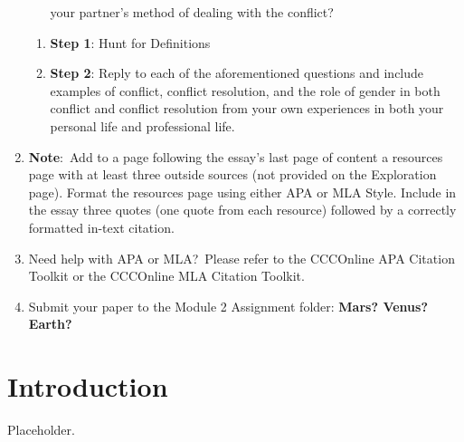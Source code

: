 \documentclass[stu,12pt]{apa7}
\begin{document}
\begin{enumerate}
\begin{itemize}
            your partner's method of dealing with the conflict?
        \end{itemize}
        \begin{enumerate}
          \item \textbf{Step 1}: Hunt for Definitions
          \item \textbf{Step 2}: Reply to each of the aforementioned questions
            and include examples of conflict, conflict resolution, and the role
            of gender in both conflict and conflict resolution from your own
            experiences in both your personal life and professional life.
        \end{enumerate}
      \item \textbf{Note}:\ Add to a page following the essay's last page of
        content a resources page with at least three outside sources (not
        provided on the Exploration page). Format the resources page using
        either APA or MLA Style. Include in the essay three quotes (one quote
        from each resource) followed by a correctly formatted in-text citation.
      \item Need help with APA or MLA?\ Please refer to the CCCOnline APA
        Citation Toolkit or the CCCOnline MLA Citation Toolkit.
      \item Submit your paper to the Module 2 Assignment folder:
        \textbf{Mars? Venus? Earth?}
    \end{enumerate}


  \newpage
  \section{Introduction}
    Placeholder.



  \newpage
  \nocite{*}
  \printbibliography[%
    title={Works Consulted},%
    heading={bibintoc},%
    category={consulted}%
  ]
\end{document}
